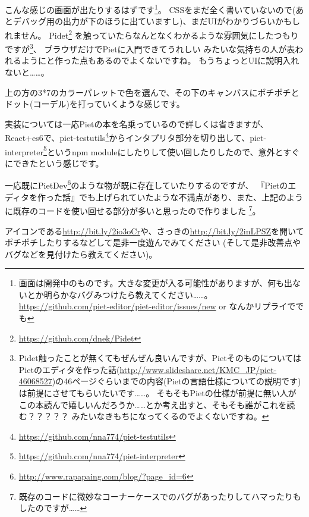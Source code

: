 こんな感じの画面が出たりするはずです\footnote{画面は開発中のものです。大きな変更が入る可能性がありますが、何も出ないとか明らかなバグみつけたら教えてください……。
\url{https://github.com/piet-editor/piet-editor/issues/new} or なんかリプライででも}。
CSSをまだ全く書いていないので(あとデバッグ用の出力が下のほうに出ていますし)、まだUIがわかりづらいかもしれません。
Pidet\footnote{\url{https://github.com/dnek/Pidet}}
を触っていたらなんとなくわかるような雰囲気にしたつもりですが\footnote{Pidet触ったことが無くてもぜんぜん良いんですが、PietそのものについてはPietのエディタを作った話(\url{http://www.slideshare.net/KMC_JP/piet-46068527})の46ページぐらいまでの内容(Pietの言語仕様についての説明です)は前提にさせてもらいたいです……。
そもそもPietの仕様が前提に無い人がこの本読んで嬉しいんだろうか……とか考え出すと、そもそも誰がこれを読む？？？？？ みたいなきもちになってくるのでよくないですね。}、
ブラウザだけでPietに入門できてうれしい みたいな気持ちの人が表われるようにと作った点もあるのでよくないですね。
もうちょっとUIに説明入れないと……。

上の方の3*7のカラーパレットで色を選んで、その下のキャンバスにポチポチとドット(コーデル)を打っていくような感じです。

実装については一応Pietの本を名乗っているので詳しくは省きますが、React+es6で、piet-testutils\footnote{\url{https://github.com/nna774/piet-testutils}}からインタプリタ部分を切り出して、piet-interpreter\footnote{\url{https://github.com/nna774/piet-interpreter}}というnpm moduleにしたりして使い回したりしたので、意外とすぐにできたという感じです。

一応既にPietDev\footnote{\url{http://www.rapapaing.com/blog/?page_id=6}}のような物が既に存在していたりするのですが、
『Pietのエディタを作った話』でも上げられていたような不満点があり、また、上記のように既存のコードを使い回せる部分が多いと思ったので作りました
\footnote{既存のコードに微妙なコーナーケースでのバグがあったりしてハマったりもしたのですが……}。

アイコンである\url{http://bit.ly/2io3oCr}や、さっきの\url{http://bit.ly/2inLPSZ}を開いてポチポチしたりするなどして是非一度遊んでみてください
(そして是非改善点やバグなどを見付けたら教えてください)。

